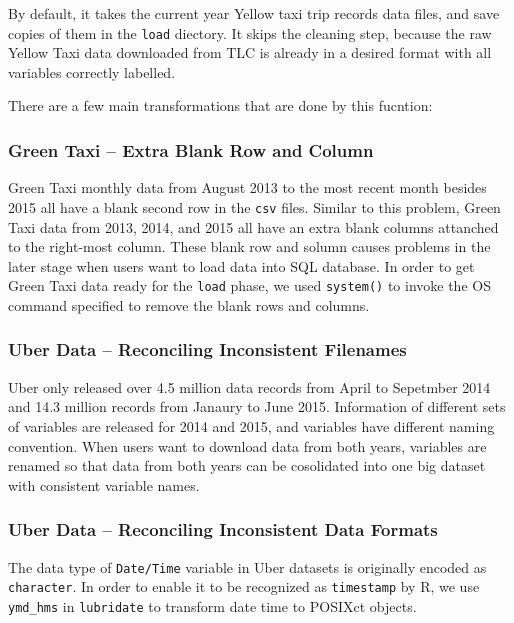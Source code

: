 \documentclass[12pt,twoside]{reedthesis}
\theoremstyle{definition}
\theoremstyle{definition}
\theoremstyle{definition}
\theoremstyle{remark}
\begin{document}
By default, it takes the current year Yellow taxi trip records data
files, and save copies of them in the \texttt{load} diectory. It skips
the cleaning step, because the raw Yellow Taxi data downloaded from TLC
is already in a desired format with all variables correctly labelled.

There are a few main transformations that are done by this fucntion:

\subsubsection{Green Taxi -- Extra Blank Row and
Column}\label{green-taxi-extra-blank-row-and-column}

Green Taxi monthly data from August 2013 to the most recent month
besides 2015 all have a blank second row in the \texttt{csv} files.
Similar to this problem, Green Taxi data from 2013, 2014, and 2015 all
have an extra blank columns attanched to the right-most column. These
blank row and solumn causes problems in the later stage when users want
to load data into SQL database. In order to get Green Taxi data ready
for the \texttt{load} phase, we used \texttt{system()} to invoke the OS
command specified to remove the blank rows and columns.

\subsubsection{Uber Data -- Reconciling Inconsistent
Filenames}\label{uber-data-reconciling-inconsistent-filenames}

Uber only released over 4.5 million data records from April to Sepetmber
2014 and 14.3 million records from Janaury to June 2015. Information of
different sets of variables are released for 2014 and 2015, and
variables have different naming convention. When users want to download
data from both years, variables are renamed so that data from both years
can be cosolidated into one big dataset with consistent variable names.

\subsubsection{Uber Data -- Reconciling Inconsistent Data
Formats}\label{uber-data-reconciling-inconsistent-data-formats}

The data type of \texttt{Date/Time} variable in Uber datasets is
originally encoded as \texttt{character}. In order to enable it to be
recognized as \texttt{timestamp} by R, we use \texttt{ymd\_hms} in
\texttt{lubridate} to transform date time to POSIXct objects.
\end{document}
